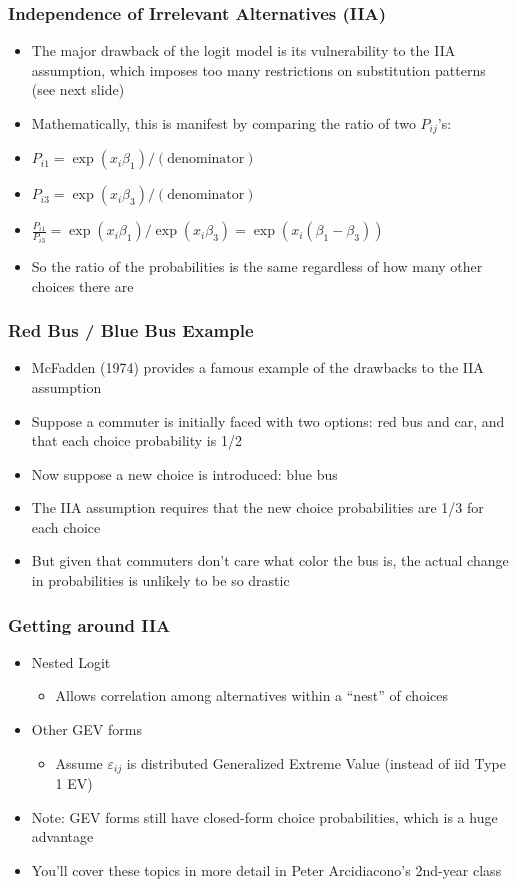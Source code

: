 \documentclass[english,xcolor=dvipsnames]{beamer}
\newcommand{\bi}{\begin{itemize}}
\newcommand{\ei}{\end{itemize}}
\begin{document}
\begin{frame}
\frametitle{Independence of Irrelevant Alternatives (IIA)}
   \bi 
   \item The major drawback of the logit model is its vulnerability to the IIA assumption, which imposes too many restrictions on substitution patterns (see next slide)
   \item Mathematically, this is manifest by comparing the ratio of two $P_{ij}$'s:
   \item $P_{i1} = \exp(x_{i}\beta_{1})/(\textrm{denominator})$
   \item $P_{i3} = \exp(x_{i}\beta_{3})/(\textrm{denominator})$
   \item $\frac{P_{i1}}{P_{i3}} = \exp(x_{i}\beta_{1})/\exp(x_{i}\beta_{3}) = \exp(x_{i}(\beta_{1}-\beta_{3}))$
   \item So the ratio of the probabilities is the same regardless of how many other choices there are
   \ei
\end{frame}

\begin{frame}
\frametitle{Red Bus / Blue Bus Example}
   \bi 
   \item McFadden (1974) provides a famous example of the drawbacks to the IIA assumption
   \item Suppose a commuter is initially faced with two options: red bus and car, and that each choice probability is 1/2
   \item Now suppose a new choice is introduced: blue bus
   \item The IIA assumption requires that the new choice probabilities are 1/3 for each choice
   \item But given that commuters don't care what color the bus is, the actual change in probabilities is unlikely to be so drastic
   \ei
\end{frame}

\begin{frame}
\frametitle{Getting around IIA}
   \bi 
   \item Nested Logit
      \bi 
      \item Allows correlation among alternatives within a ``nest'' of choices
      \ei
   \item Other GEV forms
      \bi 
      \item Assume $\varepsilon_{ij}$ is distributed Generalized Extreme Value (instead of iid Type 1 EV)
      \ei
   \item Note: GEV forms still have closed-form choice probabilities, which is a huge advantage
   \item You'll cover these topics in more detail in Peter Arcidiacono's 2nd-year class
   \ei
\end{frame}
\end{document}
